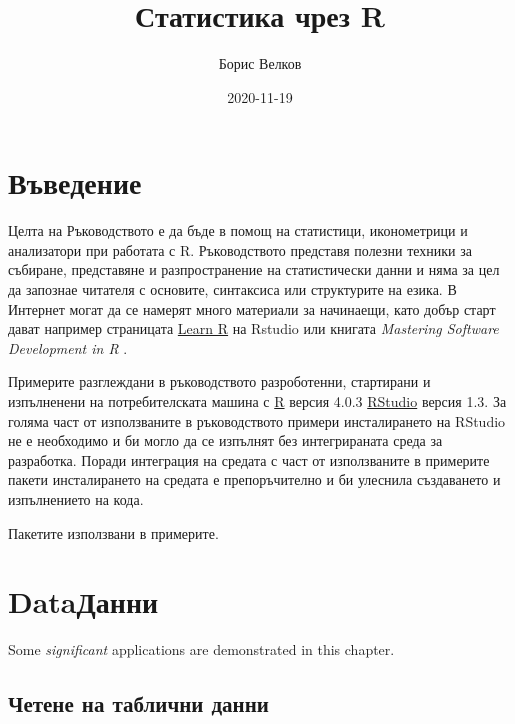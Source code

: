 \documentclass[
]{book}
\title{Статистика чрез R}
\author{Борис Велков}
\date{2020-11-19}
\begin{document}
\maketitle

{
\setcounter{tocdepth}{1}
\tableofcontents
}
\hypertarget{ux432ux44aux432ux435ux434ux435ux43dux438ux435}{%
\chapter{Въведение}\label{ux432ux44aux432ux435ux434ux435ux43dux438ux435}}

Целта на Ръководството е да бъде в помощ на статистици, иконометрици и анализатори при работата с R. Ръководството представя полезни техники за събиране, представяне и разпространение на статистически данни и няма за цел да запознае читателя с основите, синтаксиса или структурите на езика. В Интернет могат да се намерят много материали за начинаещи, като добър старт дават например страницата \href{https://support.rstudio.com/hc/en-us/categories/200098757-Learn-R}{Learn R} на Rstudio или книгата \emph{Mastering Software Development in R} \citep{Peng2017}.

Примерите разглеждани в ръководството разроботенни, стартирани и изпълненени на потребителската машина с \href{https://cran.r-project.org/}{R} версия 4.0.3 \href{https://rstudio.com/products/rstudio/}{RStudio} версия 1.3.
За голяма част от използваните в ръководството примери инсталирането на RStudio не е необходимо и би могло да се изпълнят без интегрираната среда за разработка. Поради интеграция на средата с част от използваните в примерите пакети инсталирането на средата е препоръчително и би улеснила създаването и изпълнението на кода.

Пакетите използвани в примерите.

\hypertarget{dataux434ux430ux43dux43dux438}{%
\chapter{Data\textbar Данни}\label{dataux434ux430ux43dux43dux438}}

Some \emph{significant} applications are demonstrated in this chapter.

\hypertarget{ux447ux435ux442ux435ux43dux435-ux43dux430-ux442ux430ux431ux43bux438ux447ux43dux438-ux434ux430ux43dux43dux438}{%
\section{Четене на таблични данни}\label{ux447ux435ux442ux435ux43dux435-ux43dux430-ux442ux430ux431ux43bux438ux447ux43dux438-ux434ux430ux43dux43dux438}}
\end{document}
